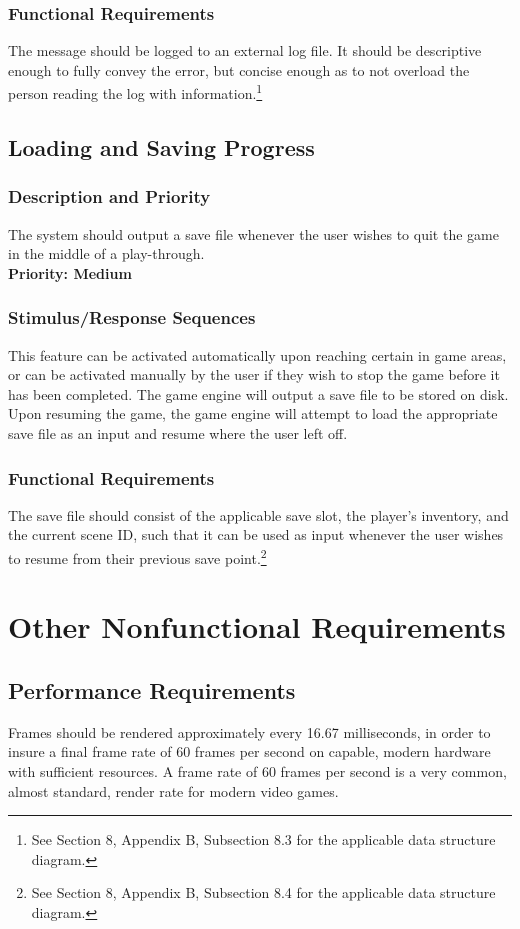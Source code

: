 \documentclass{article}
\begin{document}
		\subsubsection{Functional Requirements}
			The message should be logged to an external log file. It should be descriptive enough to fully convey the error, but concise enough as to not overload the person reading the log with information.\footnote{See Section 8, Appendix B, Subsection 8.3 for the applicable data structure diagram.}
	\subsection{Loading and Saving Progress}
		\subsubsection{Description and Priority}
			The system should output a save file whenever the user wishes to quit the game in the middle of a play-through.  \bigskip \\
			\textbf{Priority: Medium}
		\subsubsection{Stimulus/Response Sequences}
			This feature can be activated automatically upon reaching certain in game areas, or can be activated manually by the user if they wish to stop the game before it has been completed. The game engine will output a save file to be stored on disk. Upon resuming the game, the game engine will attempt to load the appropriate save file as an input and resume where the user left off. 
		\subsubsection{Functional Requirements}
			The save file should consist of the applicable save slot, the player's inventory, and the current scene ID, such that it can be used as input whenever the user wishes to resume from their previous save point.\footnote{See Section 8, Appendix B, Subsection 8.4 for the applicable data structure diagram.}
\section{Other Nonfunctional Requirements}
	\subsection{Performance Requirements}
		Frames should be rendered approximately every 16.67 milliseconds, in order to insure a final frame rate of 60 frames per second on capable, modern hardware with sufficient resources. A frame rate of 60 frames per second is a very common, almost standard, render rate for modern video games. 
\end{document}
